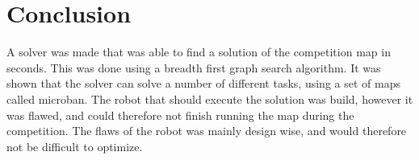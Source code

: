 \section{Conclusion}
A solver was made that was able to find a solution of the competition map in
seconds. This was done using a breadth first graph search algorithm. 
It was shown that the solver can solve a number of different tasks, using a set of maps called microban. 
The robot that should execute the solution was build, however it was flawed, and could therefore not finish running the map during the competition.
The flaws of the robot was mainly design wise, and would therefore not be difficult to optimize. 